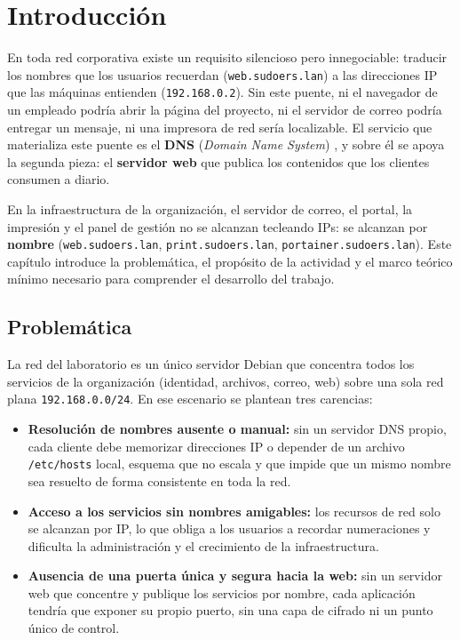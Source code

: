 
\section{Introducción}

En toda red corporativa existe un requisito silencioso pero innegociable:
traducir los nombres que los usuarios recuerdan (\texttt{web.sudoers.lan}) a
las direcciones IP que las m\'aquinas entienden (\texttt{192.168.0.2}). Sin
este puente, ni el navegador de un empleado podr\'ia abrir la p\'agina del
proyecto, ni el servidor de correo podr\'ia entregar un mensaje, ni una
impresora de red ser\'ia localizable. El servicio que materializa este puente
es el \textbf{DNS} (\textit{Domain Name System}) \citep{rfc1035}, y sobre
\'el se apoya la segunda pieza: el \textbf{servidor web} que publica los
contenidos que los clientes consumen a diario.

En la infraestructura de la organizaci\'on, el servidor de correo, el portal,
la impresi\'on y el panel de gesti\'on no se alcanzan tecleando IPs: se
alcanzan por \textbf{nombre} (\texttt{web.sudoers.lan},
\texttt{print.sudoers.lan}, \texttt{portainer.sudoers.lan}). Este cap\'itulo
introduce la problem\'atica, el prop\'osito de la actividad y el marco
te\'orico m\'inimo necesario para comprender el desarrollo del trabajo.

\subsection{Problem\'atica}

La red del laboratorio es un \'unico servidor Debian que concentra todos los
servicios de la organizaci\'on (identidad, archivos, correo, web) sobre una
sola red plana \texttt{192.168.0.0/24}. En ese escenario se plantean tres
carencias:

\begin{itemize}
  \item \textbf{Resoluci\'on de nombres ausente o manual:} sin un servidor
        DNS propio, cada cliente debe memorizar direcciones IP o depender de
        un archivo \texttt{/etc/hosts} local, esquema que no escala y que
        impide que un mismo nombre sea resuelto de forma consistente en toda
        la red.
  \item \textbf{Acceso a los servicios sin nombres amigables:} los recursos
        de red solo se alcanzan por IP, lo que obliga a los usuarios a
        recordar numeraciones y dificulta la administraci\'on y el crecimiento
        de la infraestructura.
  \item \textbf{Ausencia de una puerta \'unica y segura hacia la web:} sin un
        servidor web que concentre y publique los servicios por nombre, cada
        aplicaci\'on tendr\'ia que exponer su propio puerto, sin una capa de
        cifrado ni un punto \'unico de control.
\end{itemize}

